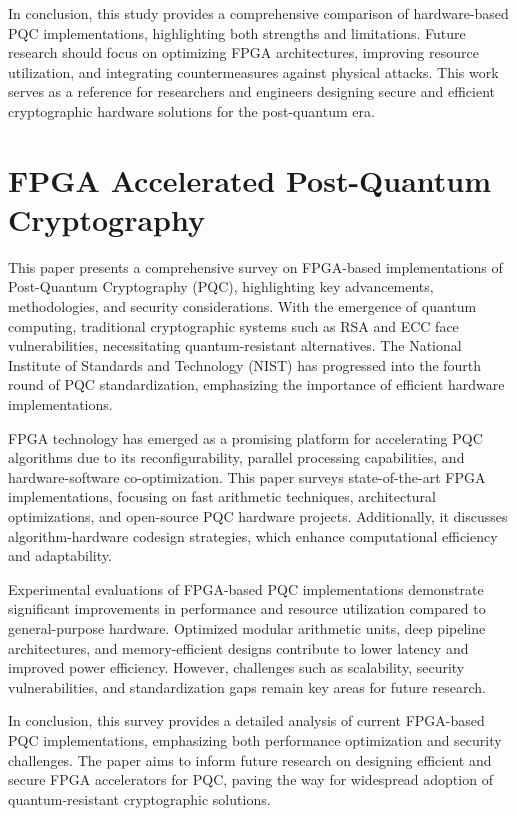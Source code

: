 \documentclass[a4paper, 12pt]{report}
\begin{document}
	In conclusion, this study provides a comprehensive comparison of hardware-based PQC implementations, highlighting both strengths and limitations. Future research should focus on optimizing FPGA architectures, improving resource utilization, and integrating countermeasures against physical attacks. This work serves as a reference for researchers and engineers designing secure and efficient cryptographic hardware solutions for the post-quantum era.
	
	\section{ FPGA Accelerated Post-Quantum Cryptography \cite{paper_1}}
	This paper presents a comprehensive survey on FPGA-based implementations of Post-Quantum Cryptography (PQC), highlighting key advancements, methodologies, and security considerations. With the emergence of quantum computing, traditional cryptographic systems such as RSA and ECC face vulnerabilities, necessitating quantum-resistant alternatives. The National Institute of Standards and Technology (NIST) has progressed into the fourth round of PQC standardization, emphasizing the importance of efficient hardware implementations.
	
	FPGA technology has emerged as a promising platform for accelerating PQC algorithms due to its reconfigurability, parallel processing capabilities, and hardware-software co-optimization. This paper surveys state-of-the-art FPGA implementations, focusing on fast arithmetic techniques, architectural optimizations, and open-source PQC hardware projects. Additionally, it discusses algorithm-hardware codesign strategies, which enhance computational efficiency and adaptability.
	
	Experimental evaluations of FPGA-based PQC implementations demonstrate significant improvements in performance and resource utilization compared to general-purpose hardware. Optimized modular arithmetic units, deep pipeline architectures, and memory-efficient designs contribute to lower latency and improved power efficiency. However, challenges such as scalability, security vulnerabilities, and standardization gaps remain key areas for future research.
	
	In conclusion, this survey provides a detailed analysis of current FPGA-based PQC implementations, emphasizing both performance optimization and security challenges. The paper aims to inform future research on designing efficient and secure FPGA accelerators for PQC, paving the way for widespread adoption of quantum-resistant cryptographic solutions.
	
\end{document}
